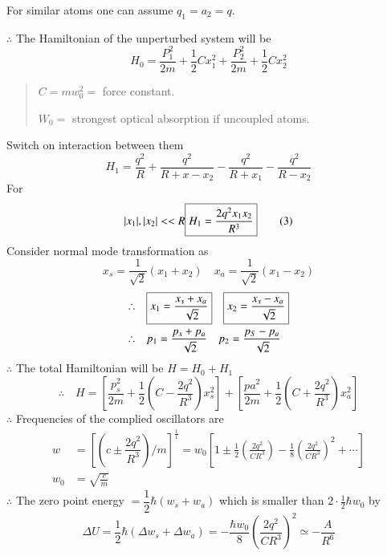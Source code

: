 For similar atoms one can assume $q_{1}=a_{2}=q$.

$\therefore$ The Hamiltonian of the unperturbed system will be
\begin{equation*}
H_{0}=\dfrac{P^{2}_{1}}{2m}+\frac{1}{2}Cx^{2}_{1}+\dfrac{P^{2}_{2}}{2m}+\frac{1}{2}Cx^{2}_{2}\tag{1}\label{lec15-eq1}
\end{equation*}
\begin{quote}
$C=mw^{2}_{0} =$ force constant.

$W_{0} =$ strongest optical absorption if uncoupled atoms.
\end{quote}
Switch on interaction between them
\begin{equation*}
H_{1}=\dfrac{q^{2}}{R}+\frac{q^{2}}{R+x-x_{2}}-\frac{q^{2}}{R+x_{1}}-\frac{q^{2}}{R-x_{2}}\tag{2}\label{lec15-eq2}
\end{equation*}
For
\begin{equation*}
|x_{1}|,|x_{2}|<< R \fbox{$H_{1}=\dfrac{2q^{2}x_{1}x_{2}}{R^{3}}$}\tag{3}\label{lec15-eq3}
\end{equation*}
Consider normal mode transformation as
\begin{equation*}
x_{s}=\dfrac{1}{\sqrt{2}}(x_{1}+x_{2})\quad x_{a}=\dfrac{1}{\sqrt{2}}(x_{1}-x_{2})\tag{4}\label{lec15-eq4}
\end{equation*}
\begin{align*}
\therefore\quad &\fbox{$x_{1}=\dfrac{x_{s}+x_{a}}{\sqrt{2}}$}\quad \fbox{$x_{2}=\dfrac{x_{s}-x_{a}}{\sqrt{2}}$}\\
\therefore\quad &p_{1}=\dfrac{p_{s}+p_{a}}{\sqrt{2}}\quad p_{2}=\dfrac{p_{S}-p_{a}}{\sqrt{2}}
\end{align*}
$\therefore$ The total Hamiltonian will be $H=H_{0}+H_{1}$
$$
\therefore\quad H=\left[\dfrac{p^{2}_{s}}{2m}+\frac{1}{2}\left(C-\frac{2q^{2}}{R^{3}}\right)x^{2}_{s}\right]+\left[\frac{pa^{2}}{2m}+\dfrac{1}{2}\left(C+\frac{2q^{2}}{R^{3}}\right)x^{2}_{a}\right]
$$
$\therefore$ Frequencies of the complied oscillators are
\begin{align*}
w &= \left[\left(c\pm \dfrac{2q^{2}}{R^{3}}\right)/m\right]^{\frac{1}{1}}=w_{0}\left[1\pm \frac{1}{2}\left(\frac{2q^{2}}{CR^{3}}\right)-\frac{1}{8}\left(\frac{2q^{2}}{CR^{3}}\right)^{2}+\cdots\right]\\
w_{0} &= \sqrt{\frac{c}{m}}
\end{align*}
$\therefore$ The zero point energy $=\dfrac{1}{2}\hbar(w_{s}+w_{a})$ which is smaller than $2\cdot \frac{1}{2}\hbar w_{0}$ by
$$
\Delta U=\frac{1}{2}\hbar (\Delta w_{s}+\Delta w_{a})=-\dfrac{\hbar w_{0}}{8}\left(\frac{2q^{2}}{CR^{3}}\right)^{2}\simeq -\frac{A}{R^{6}}
$$
